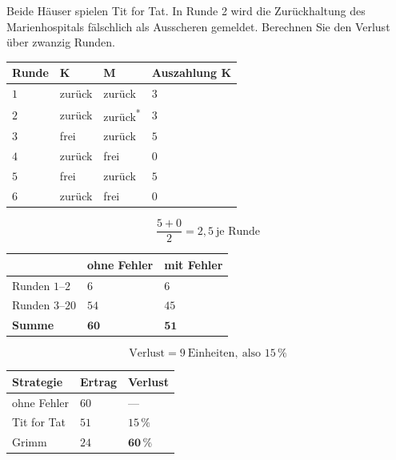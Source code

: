 \begin{aufgabe}
Beide Häuser spielen Tit for Tat. In Runde 2 wird die Zurückhaltung des Marienhospitals fälschlich als Ausscheren gemeldet. Berechnen Sie den Verlust über zwanzig Runden.

\loesung
{}
\begin{center}
{\small
\renewcommand{\arraystretch}{1.44}
\begin{tabular}{@{}P{1.6cm}P{1.6cm}P{1.6cm}P{2.4cm}@{}}
\toprule
\textbf{Runde} & \textbf{K} & \textbf{M} & \textbf{Auszahlung K}\\
\midrule
$1$ & zurück & zurück & $3$\\
$2$ & zurück & zurück\textsuperscript{*} & $3$\\
$3$ & frei & zurück & $5$\\
$4$ & zurück & frei & $0$\\
$5$ & frei & zurück & $5$\\
$6$ & zurück & frei & $0$\\
\bottomrule
\end{tabular}}
\end{center}

\[ \frac{5+0}{2} = 2{,}5 \ \text{je Runde} \]

\begin{center}
{\small
\renewcommand{\arraystretch}{1.5}
\begin{tabular}{@{}P{2.6cm}P{2.4cm}P{2.4cm}@{}}
\toprule
& \textbf{ohne Fehler} & \textbf{mit Fehler}\\
\midrule
Runden $1$--$2$ & $6$ & $6$\\
Runden $3$--$20$ & $54$ & $45$\\
\midrule
\textbf{Summe} & $\mathbf{60}$ & $\mathbf{51}$\\
\bottomrule
\end{tabular}}
\end{center}

\[ \text{Verlust} = 9 \ \text{Einheiten}, \ \text{also } 15\,\% \]

\begin{center}
\renewcommand{\arraystretch}{1.48}
\begin{tabular}{@{}P{2.6cm}P{2.2cm}P{2.6cm}@{}}
\toprule
\textbf{Strategie} & \textbf{Ertrag} & \textbf{Verlust}\\
\midrule
ohne Fehler & $60$ & --- \\
Tit for Tat & $51$ & $15\,\%$\\
Grimm & $24$ & $\mathbf{60\,\%}$\\
\bottomrule
\end{tabular}
\end{center}


\end{aufgabe}
